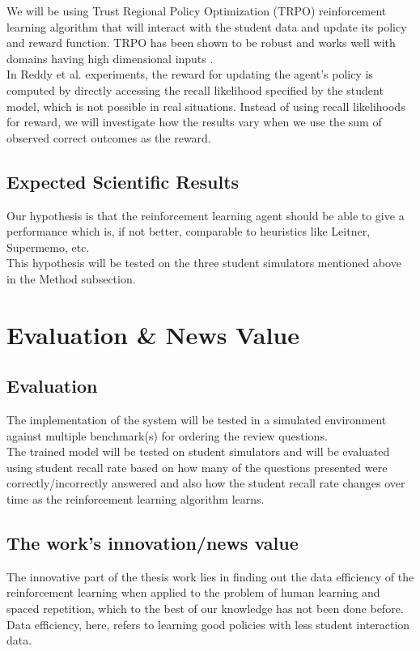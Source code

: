 \documentclass[12pt]{article}
\begin{document}
We will be using Trust Regional Policy Optimization (TRPO) reinforcement learning algorithm that will interact with the student data and update its policy and reward function. TRPO has been shown to be robust and works well with domains having high dimensional inputs {\color{blue}\cite{trpo, survey_rl}}.\\

In Reddy et al.\cite{reddy} experiments, the reward for updating the agent’s policy is computed by directly accessing the recall likelihood specified by the student model, which is not possible in real situations. Instead of using recall likelihoods for reward, we will investigate how the results vary when we use the sum of observed correct outcomes as the reward.


\subsection{Expected Scientific Results}
Our hypothesis is that the reinforcement learning agent should be able to give a performance which is, if not better, comparable to heuristics like Leitner, Supermemo, etc.\\
This hypothesis will be tested on the three student simulators mentioned above in the Method subsection.

\section{Evaluation \& News Value}
\subsection{Evaluation}
The implementation of the system will be tested in a simulated environment against multiple benchmark(s) for ordering the review questions.\\
The trained model will be tested on student simulators and will be evaluated using student recall rate based on {\color{blue}how many of the questions presented were correctly/incorrectly answered }and also how the student recall rate changes over time as the reinforcement learning algorithm learns.\\

\subsection{The work's innovation/news value} 
The innovative part of the thesis work lies in finding out the data efficiency of the reinforcement learning when applied to the problem of human learning and spaced repetition, which to the best of our knowledge has not been done before. Data efficiency, here, refers to learning good policies with less student interaction data.
\end{document}
